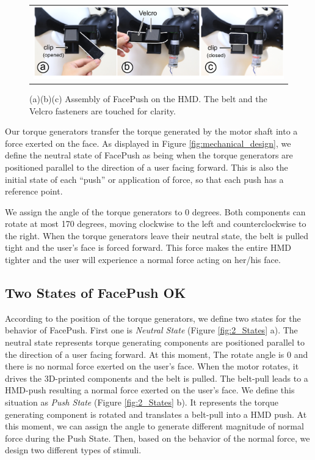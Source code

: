 \begin{figure}[hp]
\begin{center}
    \begin{tabular}{@{\hspace{0.1cm}}c}
    \includegraphics[width=1\textwidth]{figures/AssemblySystem.pdf}
    \end{tabular}
    \caption{(a)(b)(c) Assembly of FacePush on the HMD. The belt and the Velcro fasteners are touched for clarity.}
    \label{fig:assemblyandsystem}
    \end{center}
\end{figure}

Our torque generators transfer the torque generated by the motor shaft into a force exerted on the face. As displayed in Figure \ref{fig:mechanical_design}, we define the neutral state of FacePush as being when the torque generators are positioned parallel to the direction of a user facing forward. This is also the initial state of each ``push'' or application of force, so that each push has a reference point.

We assign the angle of the torque generators to 0 degrees. Both components can rotate at most 170 degrees, moving clockwise to the left and counterclockwise to the right. When the torque generators leave their neutral state, the belt is pulled tight and the user's face is forced forward. This force makes the entire HMD tighter and the user will experience a normal force acting on her/his face. 

\subsection{Two States of FacePush OK}

According to the position of the torque generators, we define two states for the behavior of FacePush. First one is \textit{Neutral State} (Figure \ref{fig:2_States} a). The neutral state represents torque generating components are positioned parallel to the direction of a user facing forward. At this moment, The rotate angle is 0 and there is no normal force exerted on the user's face. When the motor rotates, it drives the 3D-printed components and the belt is pulled. The belt-pull leads to a HMD-push resulting a normal force exerted on the user's face. We define this situation as \textit{Push State} (Figure \ref{fig:2_States} b). It represents the torque generating component is rotated and translates a belt-pull into a HMD push. At this moment, we can assign the angle to generate different magnitude of normal force during the Push State. Then, based on the behavior of the normal force, we design two different types of stimuli.

